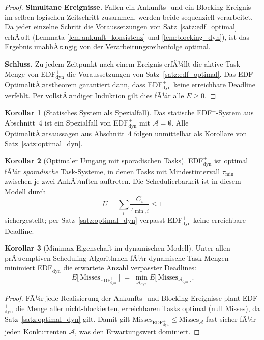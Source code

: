 ﻿\documentclass[a4paper,12pt]{article}
\theoremstyle{definition}
\newtheorem{korollar}{Korollar}
\begin{document}
\begin{proof}
		\medskip
		\textbf{Simultane Ereignisse.}
		Fallen ein Ankunfts- und ein Blocking-Ereignis im selben logischen Zeitschritt
		zusammen, werden beide sequenziell verarbeitet. Da jeder einzelne Schritt
		die Voraussetzungen von Satz~\ref{satz:edf_optimal} erhÃ¤lt (Lemmata
		\ref{lem:ankunft_konsistenz} und \ref{lem:blocking_dyn}), ist das Ergebnis
		unabhÃ¤ngig von der Verarbeitungsreihenfolge optimal.

		\medskip
		\textbf{Schluss.} Zu jedem Zeitpunkt nach einem Ereignis erfÃ¼llt die
		aktive Task-Menge von EDF$^+_{\mathrm{dyn}}$ die Voraussetzungen von
		Satz~\ref{satz:edf_optimal}. Das EDF-OptimalitÃ¤tstheorem garantiert
		dann, dass EDF$^+_{\mathrm{dyn}}$ keine erreichbare Deadline verfehlt.
		Per vollstÃ¤ndiger Induktion gilt dies fÃ¼r alle $E \ge 0$.
	\end{proof}

	\begin{korollar}[Statisches System als Spezialfall]
		\label{kor:statisch_spezialfall}
		Das statische EDF$^+$-System aus Abschnitt~4 ist ein Spezialfall von
		EDF$^+_{\mathrm{dyn}}$ mit $\mathcal{A} = \emptyset$. Alle OptimalitÃ¤ts\-aussagen
		aus Abschnitt~4 folgen unmittelbar als Korollare von
		Satz~\ref{satz:optimal_dyn}.
	\end{korollar}

	\begin{korollar}[Optimaler Umgang mit sporadischen Tasks]
		\label{kor:sporadic}
		EDF$^+_{\mathrm{dyn}}$ ist optimal fÃ¼r \emph{sporadische} Task-Systeme, in denen
		Tasks mit Mindestintervall $\tau_{\min}$ zwischen je zwei AnkÃ¼nften auftreten.
		Die Schedulierbarkeit ist in diesem Modell durch
		\[
		U = \sum_{i} \frac{C_i}{\tau_{\min,i}} \le 1
		\]
		sichergestellt; per Satz~\ref{satz:optimal_dyn} verpasst EDF$^+_{\mathrm{dyn}}$
		keine erreichbare Deadline.
	\end{korollar}

	\begin{korollar}[Minimax-Eigenschaft im dynamischen Modell]
		\label{kor:minimax_dyn}
		Unter allen prÃ¤emptiven Scheduling-Algorithmen fÃ¼r dynamische Task-Mengen
		minimiert EDF$^+_{\mathrm{dyn}}$ die erwartete Anzahl verpasster Deadlines:
		\[
		E\bigl[\,\text{Misses}_{\text{EDF}^+_{\mathrm{dyn}}}\,\bigr] \;=\;
		\min_{\mathcal{A}_{\mathrm{dyn}}} E\bigl[\,\text{Misses}_{\mathcal{A}_{\mathrm{dyn}}}\,\bigr].
		\]
	\end{korollar}

	\begin{proof}
		FÃ¼r jede Realisierung der Ankunfts- und Blocking-Ereignisse plant
		EDF$^+_{\mathrm{dyn}}$ die Menge aller nicht-blockierten, erreichbaren Tasks
		optimal (null Misses), da Satz~\ref{satz:optimal_dyn} gilt.
		Damit gilt $\text{Misses}_{\text{EDF}^+_{\mathrm{dyn}}} \le \text{Misses}_{\mathcal{A}}$
		fast sicher fÃ¼r jeden Konkurrenten $\mathcal{A}$, was den Erwartungswert dominiert.
	\end{proof}
\end{document}
